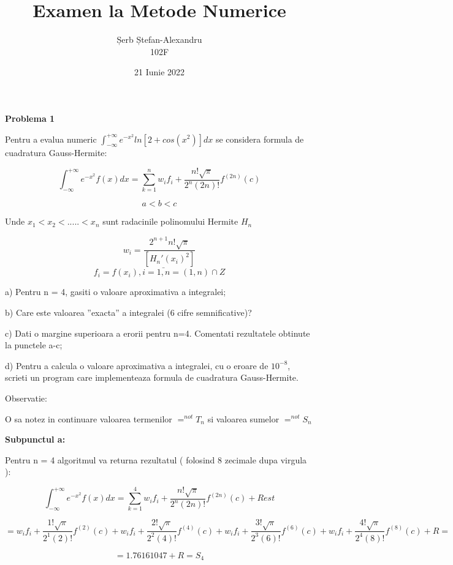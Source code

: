 \documentclass[a4paper,12pt]{article}
\begin{document}
\begin{titlepage}
\title{Examen la Metode Numerice}
\author{Șerb Ștefan-Alexandru \\ 102F}
\date{21 Iunie 2022}
\maketitle
\end{titlepage}

\large \textbf{Problema 1}
\normalsize \bigskip


Pentru a evalua numeric $\int_{-\infty}^{+\infty}e^{-x^2}ln[2+ cos(x^2)]dx$
se considera formula de cuadratura Gauss-Hermite:


$$\int_{-\infty}^{+\infty}e^{-x^2}f(x)dx = \sum_{k=1}^{n}w_if_i 
+ \frac{n! \sqrt{\pi}}{2^n (2n)!}f^{(2n)}(c)$$

$$a<b<c$$

Unde $x_1 < x_2 < ..... < x_n$ sunt radacinile polinomului Hermite $H_n$

$$w_i = \frac{2^{n+1}n! \sqrt{\pi}}{[H_n'(x_i)^2]}$$
$$f_i = f(x_i), i = \bar{1,n} = (1,n) \cap Z$$

a) Pentru n = 4, gasiti o valoare aproximativa a integralei;

b) Care este valoarea ”exacta” a integralei (6 cifre semnificative)?

c) Dati o margine superioara a erorii pentru n=4. Comentati
rezultatele obtinute la punctele a-c;

d) Pentru a calcula o valoare aproximativa a integralei, cu o eroare
de $10^{-8}$, scrieti un program care implementeaza formula de
cuadratura Gauss-Hermite.

Observatie:

O sa notez in continuare valoarea termenilor $=^{not}T_{n}$ si valoarea sumelor
$=^{not}S_{n}$

\bigskip
\textbf{Subpunctul a:}
\normalsize \bigskip

Pentru n = 4 algoritmul va returna rezultatul ( folosind 8 zecimale dupa virgula ):

$$\int_{-\infty}^{+\infty}e^{-x^2}f(x)dx = \sum_{k=1}^{4}w_if_i 
+ \frac{n! \sqrt{\pi}}{2^n (2n)!}f^{(2n)}(c) + Rest$$


$$=w_if_i 
+ \frac{1! \sqrt{\pi}}{2^1 (2)!}f^{(2)}(c) + w_if_i 
+ \frac{2! \sqrt{\pi}}{2^2 (4)!}f^{(4)}(c) + w_if_i 
+ \frac{3! \sqrt{\pi}}{2^3 (6)!}f^{(6)}(c) + 
w_if_i 
+ \frac{4! \sqrt{\pi}}{2^4 (8)!}f^{(8)}(c) + R =$$

$$ = 1.76161047 + R = S_{4}$$
\end{document}
